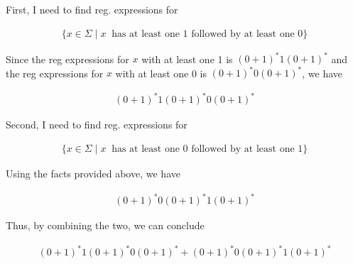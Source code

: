 \documentclass[12pt]{article}
\begin{document}
\begin{enumerate}[a.]
    First, I need to find reg. expressions for

    \begin{align}
    \{x \in \Sigma \mid x\:\text{ has at least one 1 followed by at least one 0}\}
    \end{align}

    \bigskip

    Since the reg expressions for $x$ with at least one 1 is $(0 + 1)^*1(0 + 1)^*$
    and the reg expressions for $x$ with at least one 0 is $(0 + 1)^*0(0 + 1)^*$,
    we have

    \begin{align}
        (0+1)^*1(0+1)^*0(0+1)^*
    \end{align}

    \bigskip

    Second, I need to find reg. expressions for

    \begin{align}
    \{x \in \Sigma \mid x\:\text{ has at least one 0 followed by at least one 1}\}
    \end{align}

    \bigskip

    Using the facts provided above, we have

    \begin{align}
        (0+1)^*0(0+1)^*1(0+1)^*
    \end{align}

    \bigskip

    Thus, by combining the two, we can conclude

    \begin{align}
        (0+1)^*1(0+1)^*0(0+1)^* + (0+1)^*0(0+1)^*1(0+1)^*
    \end{align}






\end{enumerate}
\end{document}
